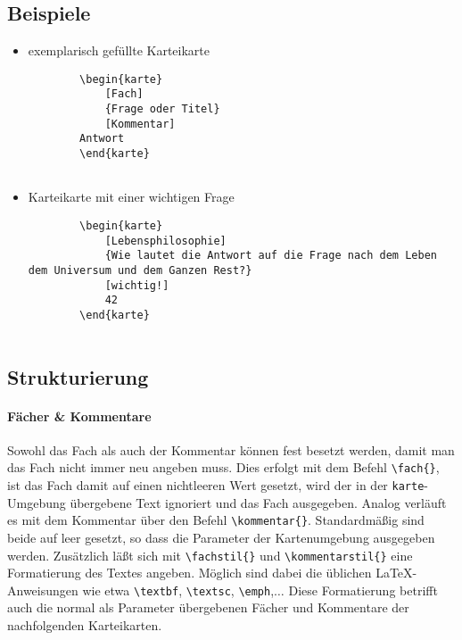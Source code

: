 \documentclass[a4paper]{article}
\begin{document}
\subsection{Beispiele}
\begin{itemize}
	\item exemplarisch gefüllte Karteikarte
	\begin{lstlisting}
		\begin{karte}
			[Fach]
			{Frage oder Titel}
			[Kommentar]
		Antwort
		\end{karte}
		
	\end{lstlisting} 
	\item Karteikarte mit einer wichtigen Frage
	\begin{lstlisting}
		\begin{karte}
			[Lebensphilosophie]
			{Wie lautet die Antwort auf die Frage nach dem Leben dem Universum und dem Ganzen Rest?}
			[wichtig!]
			42
		\end{karte}
		
	\end{lstlisting}
\end{itemize}

\subsection{Strukturierung}
\paragraph{Fächer \& Kommentare}
Sowohl das Fach als auch der Kommentar können fest besetzt werden, damit man das Fach nicht immer neu angeben muss. Dies erfolgt mit dem Befehl \lstinline!\fach{}!, ist das Fach damit auf einen nichtleeren Wert gesetzt, wird der in der \lstinline!karte!-Umgebung übergebene Text ignoriert und das Fach ausgegeben. Analog verläuft es mit dem Kommentar über den Befehl \lstinline!\kommentar{}!. Standardmäßig sind beide auf leer gesetzt, so dass die Parameter der Kartenumgebung ausgegeben werden. 
Zusätzlich läßt sich mit \lstinline!\fachstil{}! und \lstinline!\kommentarstil{}! eine Formatierung des Textes angeben. Möglich sind dabei die üblichen \LaTeX-Anweisungen wie etwa \lstinline!\textbf!, \lstinline!\textsc!, \lstinline!\emph!,$\ldots$ Diese Formatierung betrifft auch die normal als Parameter übergebenen Fächer und Kommentare der nachfolgenden Karteikarten. 
\end{document}
